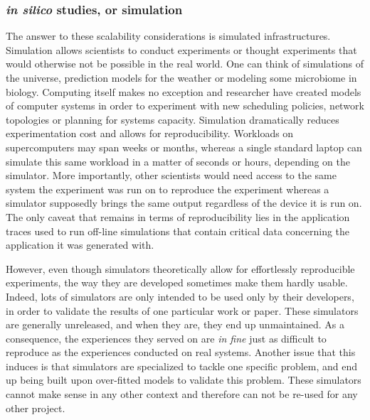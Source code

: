 \subsubsection{\textit{in silico} studies, or simulation}

The answer to these scalability considerations is simulated infrastructures.
Simulation allows scientists to conduct experiments or thought experiments that
would otherwise not be possible in the real world. One can think of simulations
of the universe, prediction models for the weather or modeling some microbiome
in biology. Computing itself makes no exception and researcher have created
models of computer systems in order to experiment with new scheduling policies,
network topologies or planning for systems capacity. Simulation
dramatically reduces experimentation cost and allows for reproducibility.
Workloads on supercomputers may span weeks or months, whereas a single standard
laptop can simulate this same workload in a matter of seconds or hours,
depending on the simulator. More importantly, other scientists would need
access to the same system the experiment was run on to reproduce the experiment
whereas a simulator supposedly brings the same output regardless of the device
it is run on. The only caveat that remains in terms of reproducibility lies in
the application traces used to run off-line simulations that contain critical
data concerning the application it was generated with.

However, even though simulators theoretically allow for effortlessly
reproducible experiments, the way they are developed sometimes make them hardly
usable. Indeed, lots of simulators are only intended to be used only by their
developers, in order to validate the results of one particular work or paper.
These simulators are generally unreleased, and when they are, they end up
unmaintained. As a consequence, the experiences they served on are \textit{in
fine} just as difficult to reproduce as the experiences conducted on real
systems.
Another issue that this induces is that simulators are specialized to tackle
one specific problem, and end up being built upon over-fitted models to
validate this problem. These simulators cannot make sense in any other context
and therefore can not be re-used for any other project.

